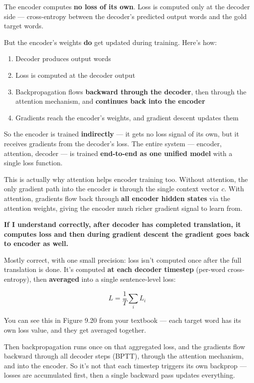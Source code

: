 The encoder computes \textbf{no loss of its own}. Loss is computed only at the decoder side --- cross-entropy between the decoder's predicted output words and the gold target words.

But the encoder's weights \textbf{do} get updated during training. Here's how:

\begin{enumerate}
    \item Decoder produces output words
    \item Loss is computed at the decoder output
    \item Backpropagation flows \textbf{backward through the decoder}, then through the attention mechanism, and \textbf{continues back into the encoder}
    \item Gradients reach the encoder's weights, and gradient descent updates them
\end{enumerate}

So the encoder is trained \textbf{indirectly} --- it gets no loss signal of its own, but it receives gradients from the decoder's loss. The entire system --- encoder, attention, decoder --- is trained \textbf{end-to-end as one unified model} with a single loss function.

This is actually why attention helps encoder training too. Without attention, the only gradient path into the encoder is through the single context vector $c$. With attention, gradients flow back through \textbf{all encoder hidden states} via the attention weights, giving the encoder much richer gradient signal to learn from.

\bigskip

\textbf{If I understand correctly, after decoder has completed translation, it computes loss and then during gradient descent the gradient goes back to encoder as well.}

Mostly correct, with one small precision: loss isn't computed once after the full translation is done. It's computed \textbf{at each decoder timestep} (per-word cross-entropy), then \textbf{averaged} into a single sentence-level loss:

$$L = \frac{1}{T} \sum_i L_i$$

You can see this in Figure 9.20 from your textbook --- each target word has its own loss value, and they get averaged together.

Then backpropagation runs once on that aggregated loss, and the gradients flow backward through all decoder steps (BPTT), through the attention mechanism, and into the encoder. So it's not that each timestep triggers its own backprop --- losses are accumulated first, then a single backward pass updates everything.

